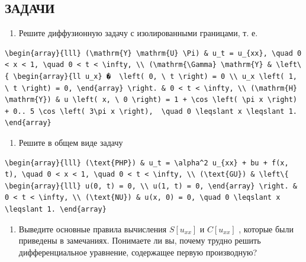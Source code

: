 \documentclass[
  ukrainian,
]{article}
\providecommand{\tightlist}{%
  \setlength{\itemsep}{0pt}\setlength{\parskip}{0pt}}
\begin{document}
\subsection{ЗАДАЧИ}\label{ux437ux430ux434ux430ux447ux438-4}

\begin{enumerate}
\def\labelenumi{\arabic{enumi}.}
\tightlist
\item
  Решите диффузионную задачу с изолированными границами, т. е.
\end{enumerate}

\begin{verbatim}
\begin{array}{lll} (\mathrm{Y} \mathrm{U} \Pi) & u_t = u_{xx}, \quad 0 < x < 1, \quad 0 < t < \infty, \\ (\mathrm{\Gamma} \mathrm{Y} & \left\{ \begin{array}{ll u_x} �  \left( 0, \ t \right) = 0 \\ u_x \left( 1, \ t \right) = 0, \end{array} \right. & 0 < t < \infty, \\ (\mathrm{H} \mathrm{Y}) & u \left( x, \ 0 \right) = 1 + \cos \left( \pi x \right) + 0.. 5 \cos \left( 3\pi x \right),  \quad 0 \leqslant x \leqslant 1. \end{array}
\end{verbatim}

\begin{enumerate}
\def\labelenumi{\arabic{enumi}.}
\setcounter{enumi}{1}
\tightlist
\item
  Решите в общем виде задачу
\end{enumerate}

\begin{verbatim}
\begin{array}{lll} (\text{PHP}) & u_t = \alpha^2 u_{xx} + bu + f(x, t), \quad 0 < x < 1, \quad 0 < t < \infty, \\ (\text{GU}) & \left\{ \begin{array}{lll} u(0, t) = 0, \\ u(1, t) = 0, \end{array} \right. & 0 < t < \infty, \\ (\text{NU}) & u(x, 0) = 0, \quad 0 \leqslant x \leqslant 1. \end{array}
\end{verbatim}

\begin{enumerate}
\def\labelenumi{\arabic{enumi}.}
\setcounter{enumi}{2}
\tightlist
\item
  Выведите основные правила вычисления \(S[u_{xx}]\) и \(C[u_{xx}]\) ,
  которые были приведены в замечаниях. Понимаете ли вы, почему трудно
  решить дифференциальное уравнение, содержащее первую производную?
\end{enumerate}
\end{document}
